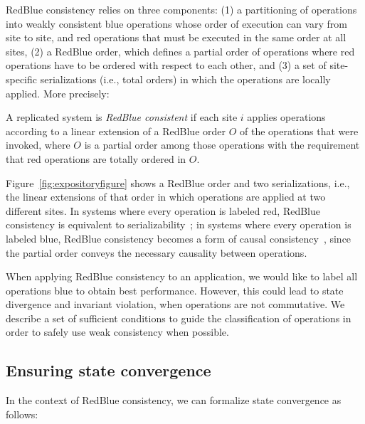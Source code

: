RedBlue consistency relies on three components: (1) a partitioning of operations into weakly consistent blue operations whose order of execution
can vary from site to site, and red operations that must
be executed in the same order at all sites, (2) a RedBlue order, which defines a partial order of
operations where red operations have to be ordered with respect to each other, and (3) a set of site-specific serializations (i.e., total orders)
in which the operations are locally applied. More precisely:

\begin{mydef}
A replicated system is {\em RedBlue consistent} if each site $i$ applies
operations according to a linear extension of a RedBlue order $O$ of the operations
that were invoked, where $O$ is a partial order among those operations with the requirement that red operations are totally ordered in $O$.
\label{def:rbct}
\end{mydef}

Figure~\ref{fig:expositoryfigure} shows a RedBlue order and two
serializations, i.e., the linear extensions of that order in which
operations are applied at two different sites. In systems where every operation is
labeled red, RedBlue consistency is equivalent to
serializability~\cite{Bernstein1987CCR}; in systems where every
operation is labeled blue, RedBlue consistency becomes a form of causal consistency~\cite{bayou,cops,
Mahajan2010Depot}, since the partial order conveys the necessary causality between operations.

When applying RedBlue consistency to an application, we would like to label all operations blue
to obtain best performance.
However, this could lead to state divergence and invariant violation, when operations are not commutative.
We describe a set of sufficient conditions to guide the classification of operations in order to safely use weak consistency
when possible.


\subsection{Ensuring state convergence}
In the context of RedBlue consistency, we can formalize state convergence as follows:

